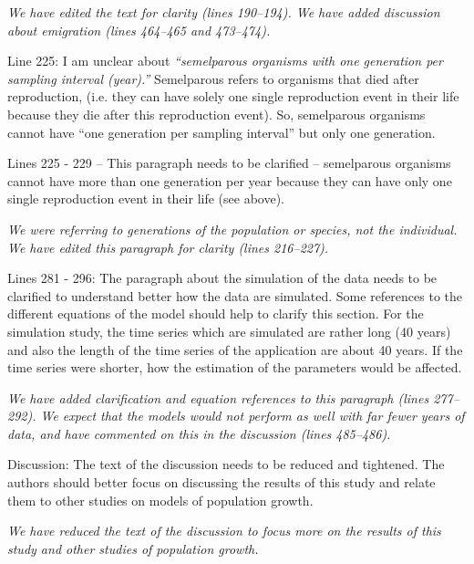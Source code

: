 \documentclass[12pt,english]{article}
\begin{document}
\begin{spacing}{1.9}
\begin{flushleft}
\vspace{0.5cm}
\textit{We have edited the text for clarity (lines 190--194).  We have added discussion about emigration
(lines 464--465 and 473--474).}
\vspace{0.5cm}

Line 225: I am unclear about \textit{``semelparous organisms with one generation per sampling
interval (year).''} Semelparous refers to organisms that died after reproduction, (i.e. they can
have solely one single reproduction event in their life because they die after this
reproduction event). So, semelparous organisms cannot have ``one generation per sampling
interval'' but only one generation.

Lines 225 - 229 – This paragraph needs to be clarified – semelparous organisms cannot have
more than one generation per year because they can have only one single reproduction
event in their life (see above).

\vspace{0.5cm}
\textit{We were referring to generations of the population or species, not the individual.  We have edited 
this paragraph for clarity (lines 216--227).}
\vspace{0.5cm}

Lines 281 - 296: The paragraph about the simulation of the data needs to be clarified to
understand better how the data are simulated. Some references to the different equations
of the model should help to clarify this section. For the simulation study, the time series
which are simulated are rather long (40 years) and also the length of the time series of the
application are about 40 years. If the time series were shorter, how the estimation of the
parameters would be affected.

\vspace{0.5cm}
\textit{We have added clarification and equation references to this paragraph (lines 277--292). 
We expect that
the models would not perform as well with far fewer years of data, and have commented on
this in the discussion (lines 485--486).}
\vspace{0.5cm}

Discussion: The text of the discussion needs to be reduced and tightened. The authors
should better focus on discussing the results of this study and relate them to other studies
on models of population growth.

\vspace{0.5cm}
\textit{We have reduced the text of the discussion to focus more on the results of this
study and other studies of population growth.}


\end{flushleft}
\end{spacing}
\end{document}
